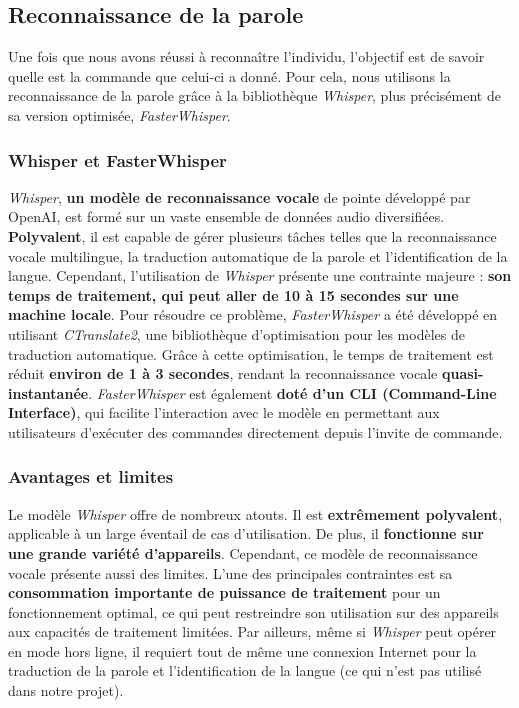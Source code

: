 \subsection{Reconnaissance de la parole}
\label{subsec:Reconnaissance_parole}

Une fois que nous avons réussi à reconnaître l'individu, l'objectif est de
savoir quelle est la commande que celui-ci a donné. Pour cela, nous utilisons la
reconnaissance de la parole grâce à la bibliothèque \textit{Whisper}, plus
précisément de sa version optimisée, \textit{FasterWhisper}.

\subsubsection*{Whisper et FasterWhisper}

\textit{Whisper}, \textbf{un modèle de reconnaissance vocale} de pointe développé par OpenAI, est formé sur un vaste ensemble de données audio diversifiées. \textbf{Polyvalent}, il est
capable de gérer plusieurs tâches telles que la reconnaissance vocale multilingue, la traduction automatique de la parole et l'identification de la langue.
Cependant, l'utilisation de \textit{Whisper} présente une contrainte majeure : \textbf{son temps de traitement, qui peut aller de 10 à 15 secondes sur une machine locale}.
Pour résoudre ce problème, \textit{FasterWhisper} a été développé en utilisant
\textit{CTranslate2}, une bibliothèque d'optimisation pour les modèles de
traduction automatique. Grâce à cette optimisation, le temps de
	traitement est réduit \textbf{environ de 1 à 3 secondes}, rendant la reconnaissance vocale \textbf{quasi-instantanée}.
\textit{FasterWhisper} est également \textbf{doté d'un CLI (Command-Line Interface)}, qui facilite l'interaction avec le modèle en permettant aux utilisateurs d'exécuter des commandes directement depuis
l'invite de commande.

\subsubsection*{Avantages et limites}

Le modèle \textit{Whisper} offre de nombreux atouts. Il est \textbf{extrêmement
	polyvalent}, applicable à un large éventail de cas d'utilisation. De plus, il
\textbf{fonctionne sur une grande variété d'appareils}. Cependant, ce modèle de
reconnaissance vocale présente aussi des limites. L'une des principales
contraintes est sa \textbf{consommation importante de puissance de traitement}
pour un fonctionnement optimal, ce qui peut restreindre son utilisation sur des
appareils aux capacités de traitement limitées. Par ailleurs, même si
\textit{Whisper} peut opérer en mode hors ligne, il requiert tout de même une
connexion Internet pour la traduction de la parole et l'identification de la
langue (ce qui n'est pas utilisé dans notre projet).

